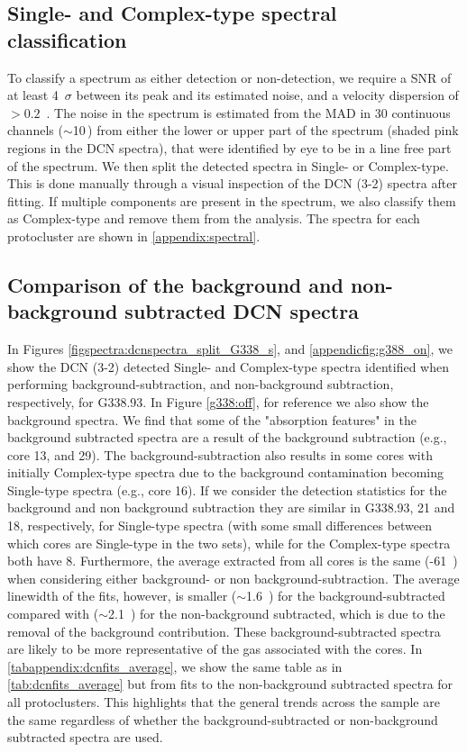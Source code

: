  
\subsection{Single- and Complex-type spectral classification}

To classify a spectrum as either detection or non-detection, we require a SNR of at least 4~$\sigma$ between its peak and its estimated noise, and a velocity dispersion of $> 0.2$~\kms. The noise in the spectrum is estimated from the MAD in 30 continuous channels ($\sim$10\,\kms) from either the lower or upper part of the spectrum (shaded pink regions in the DCN spectra), that were identified by eye to be in a line free part of the spectrum. We then split the detected spectra in Single- or Complex-type. This is done manually through a visual inspection of the DCN (3-2) spectra after fitting. If multiple components are present in the spectrum, we also  classify them as Complex-type and  remove them from the analysis. The spectra for each protocluster are shown in \cref{appendix:spectral}. 

\subsection{Comparison of the background and non-background subtracted DCN spectra}

In Figures \ref{figspectra:dcnspectra_split_G338_s}, and \ref{appendicfig:g388_on}, we show the DCN (3-2) detected Single- and Complex-type spectra identified when performing background-subtraction, and non-background subtraction, respectively, for G338.93. In Figure \ref{g338:off}, for reference we also show the background spectra. We find that some of the "absorption features" in the background subtracted spectra are a result of the background subtraction (e.g., core 13, and 29). The background-subtraction also results in some cores with initially Complex-type spectra due to the background contamination becoming Single-type spectra (e.g., core 16). If we consider the detection statistics for the background and non background subtraction they are similar in G338.93, 21 and 18, respectively, for Single-type spectra (with some small differences between which cores are Single-type in the two sets), while for the Complex-type spectra both have 8. Furthermore, the average \vlsr extracted from all cores is the same (-61~\kms) when considering either background- or non background-subtraction. The average linewidth of the fits, however, is smaller ($\sim$1.6~\kms) for the background-subtracted compared with ($\sim$2.1~\kms) for the non-background subtracted, which is due to the removal of the background contribution. These background-subtracted spectra are likely to be more representative of the gas associated with the cores. In \cref{tabappendix:dcnfits_average}, we show the same table as in \cref{tab:dcnfits_average} but from fits to the non-background subtracted spectra for all protoclusters. This highlights that the general trends across the sample are the same regardless of whether the background-subtracted or non-background subtracted spectra are used.


